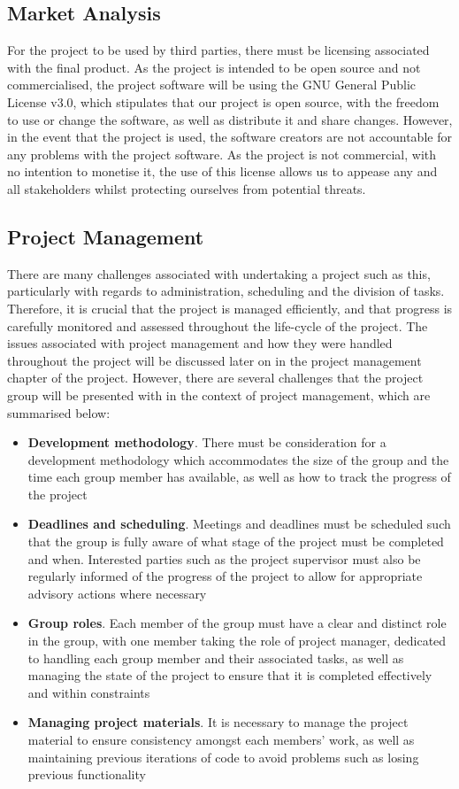 \subsection{Market Analysis}
For the project to be used by third parties, there must be licensing associated with the final product. As the project is intended to be open source and not commercialised, the project software will be using the GNU General Public License v3.0, which stipulates that our project is open source, with the freedom to use or change the software, as well as distribute it and share changes. However, in the event that the project is used, the software creators are not accountable for any problems with the project software. As the project is not commercial, with no intention to monetise it, the use of this license allows us to appease any and all stakeholders whilst protecting ourselves from potential threats.

\subsection{Project Management}
There are many challenges associated with undertaking a project such as this, particularly with regards to administration, scheduling and the division of tasks. Therefore, it is crucial that the project is managed efficiently, and that progress is carefully monitored and assessed throughout the life-cycle of the project. The issues associated with project management and how they were handled throughout the project will be discussed later on in the project management chapter of the project. However, there are several challenges that the project group will be presented with in the context of project management, which are summarised below:
\begin{itemize}
\item \textbf{Development methodology}. There must be consideration for a development methodology which accommodates the size of the group and the time each group member has available, as well as how to track the progress of the project
\item \textbf{Deadlines and scheduling}. Meetings and deadlines must be scheduled such that the group is fully aware of what stage of the project must be completed and when. Interested parties such as the project supervisor must also be regularly informed of the progress of the project to allow for appropriate advisory actions where necessary
\item \textbf{Group roles}. Each member of the group must have a clear and distinct role in the group, with one member taking the role of project manager, dedicated to handling each group member and their associated tasks, as well as managing the state of the project to ensure that it is completed effectively and within constraints
\item \textbf{Managing project materials}. It is necessary to manage the project material to ensure consistency amongst each members’ work, as well as maintaining previous iterations of code to avoid problems such as losing previous functionality
\end{itemize}

